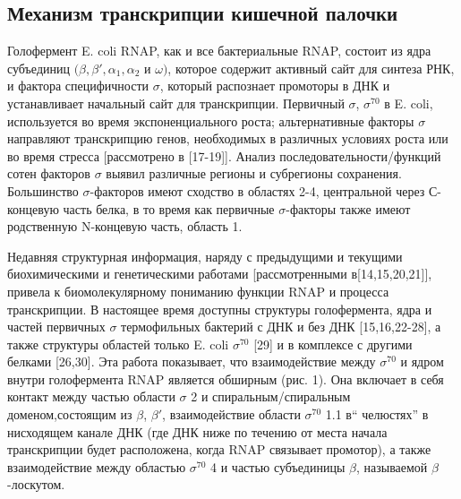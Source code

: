 \documentclass[a4paper,12pt]{article}
\begin{document}
    \subsection{Механизм транскрипции кишечной палочки }
        \par{Голофермент E. coli RNAP, как и все бактериальные RNAP, состоит из ядра субъединиц
        \((\beta,\beta',\alpha_1,\alpha_2\) и \(\omega)\), которое содержит активный сайт для синтеза РНК, и фактора
        специфичности \(\sigma\), который распознает промоторы в ДНК и устанавливает начальный сайт для транскрипции.
        Первичный \(\sigma\), \(\sigma^{70}\) в E. coli, используется во время экспоненциального роста; альтернативные
        факторы \(\sigma\) направляют транскрипцию генов, необходимых в различных условиях роста или во время стресса
        [рассмотрено в [17-19]]. Анализ последовательности/функций сотен факторов \(\sigma\) выявил различные регионы и
        субрегионы сохранения. Большинство \(\sigma\)-факторов имеют сходство в областях 2-4, центральной через С-концевую
        часть белка, в то время как первичные \(\sigma\)-факторы также имеют родственную N-концевую часть, область 1.}
        \par{Недавняя структурная информация, наряду с предыдущими и текущими биохимическими и генетическими работами
        [рассмотренными в[14,15,20,21]], привела к биомолекулярному пониманию функции RNAP и процесса транскрипции. В
        настоящее время доступны структуры голофермента, ядра и частей первичных \(\sigma\) термофильных бактерий с ДНК и без
        ДНК [15,16,22-28], а также структуры областей только E. coli \(\sigma^{70}\) [29] и в комплексе с другими белками
        [26,30]. Эта работа показывает, что взаимодействие между \(\sigma^{70}\) и ядром внутри голофермента RNAP является
        обширным (рис. 1). Она включает в себя контакт между частью области \(\sigma\) 2 и спиральным/спиральным
        доменом,состоящим из \(\beta\), \(\beta'\), взаимодействие области \(\sigma^{70}\) 1.1 в“ челюстях” в нисходящем
        канале ДНК (где ДНК ниже по течению от места начала транскрипции будет расположена, когда RNAP связывает промотор), а
        также взаимодействие между областью \(\sigma^{70}\) 4 и частью субъединицы \(\beta\), называемой \(\beta\)-лоскутом.}
\end{document}
